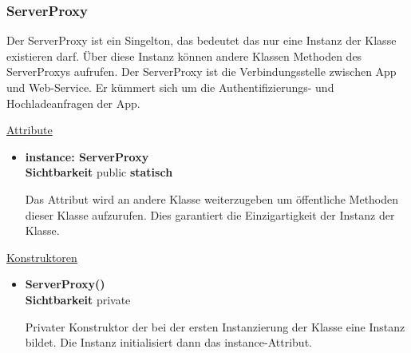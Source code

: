 \subsubsection{ServerProxy} \label{app:klasse:ServerProxy}
Der ServerProxy ist ein Singelton, das bedeutet das nur eine Instanz der  Klasse existieren darf. Über diese Instanz können andere Klassen Methoden des ServerProxys aufrufen. Der ServerProxy ist die Verbindungsstelle zwischen App und Web-Service. Er kümmert sich um die Authentifizierungs- und Hochladeanfragen der App.\newline

\underline{Attribute}
\begin{itemize}
\itemsep0pt
\item \textbf{instance: ServerProxy} \hfill\\ 
\textbf{Sichtbarkeit} public \newline
\textbf{statisch} 

Das Attribut wird an andere Klasse weiterzugeben um öffentliche Methoden dieser Klasse aufzurufen. Dies garantiert die Einzigartigkeit der Instanz der Klasse. 

\end{itemize}

\underline{Konstruktoren}
\begin{itemize}
\itemsep0pt
\item \textbf{ServerProxy()} \hfill\\
\textbf{Sichtbarkeit} private

Privater Konstruktor der bei der ersten Instanzierung der Klasse eine Instanz bildet. Die Instanz initialisiert dann das instance-Attribut. 
\end{itemize}

